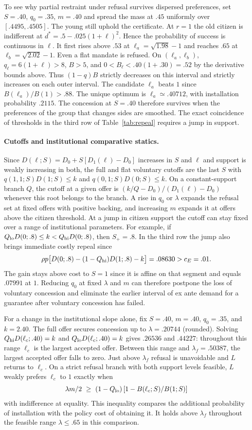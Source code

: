 \documentclass[11pt,letterpaper]{article}
\begin{document}
To see why partial restraint under refusal survives dispersed preferences, set $S=.40$, $q_0=.35$, $m=.40$ and spread the mass at $.45$ uniformly over $[.4495,.4505]$. The young still uphold the certificate. At $r=1$ the old citizen is indifferent at $d^*=.5-.025(1+\ell)^2$. Hence the probability of success is continuous in $\ell$. It first rises above $.53$ at $\ell_a=\sqrt{1.98}-1$ and reaches $.65$ at $\ell_b=\sqrt{2.02}-1$. Even a flat mandate is refused. On $(\ell_a,\ell_b)$, $q_\ell=6(1+\ell)>8$, $B>5$, and $0<B_\ell<.40(1+.30)=.52$ by the derivative bounds above. Thus $(1-q)B$ strictly decreases on this interval and strictly increases on each outer interval. The candidate $\ell_a$ beats $1$ since $B(\ell_a)/B(1)>.88$. The unique optimum is $\ell_a\simeq .40712$, with installation probability $.2115$. The concession at $S=.40$ therefore survives when the preferences of the group that changes sides are smoothed. The exact coincidence of thresholds in the third row of Table~\ref{tab:repeal} requires a jump in support.

\paragraph{Cutoffs and institutional comparative statics.}
Since $D(\ell;S)=D_0+S[D_1(\ell)-D_0]$ increases in $S$ and $\ell$ and support is weakly increasing in both, the full and flat voluntary cutoffs are the last $S$ with $q(1,1;S)D(1;S)\le k$ and $q(0,1;S)D(0;S)\le k$. On a constant-support branch $Q$, the cutoff at a given offer is $(k/Q-D_0)/(D_1(\ell)-D_0)$ whenever this root belongs to the branch. A rise in $q_0$ or $\lambda$ expands the refusal set at fixed offers with positive backing, and increasing $m$ expands it at offers above the citizen threshold. At a jump in citizen support the cutoff can stay fixed over a range of institutional parameters. For example, if $Q_{\rm lo}D(0;.8)\le k<Q_{\rm hi}D(0;.8)$, then $S_+=.8$. In the third row the jump also brings immediate costly repeal since
\[
 \rho p\big[D(0;.8)-(1-Q_{\rm hi})D(1;.8)-k\big]
 =.08630>c_E=.01 .
\]
The gain stays above cost to $S=1$ since it is affine on that segment and equals $.07991$ at $1$. Reducing $q_0$ at fixed $\lambda$ and $m$ can therefore postpone the loss of voluntary concession and eliminate the earlier interval of ex ante demand for a guarantee after voluntary concession has failed.

For a change in the institutional slope alone, fix $S=.40$, $m=.40$, $q_0=.35$, and $k=2.40$. The full offer secures concession up to $\lambda=.20744$ (rounded). Solving $Q_{\rm hi}D(\ell_c;.40)=k$ and $Q_{\rm lo}D(\ell_c;.40)=k$ gives $.26536$ and $.44227$: throughout this range $\ell_c$ is the largest accepted offer. Between this range and $\lambda_f=.50387$, the largest accepted offer falls to zero. Just above $\lambda_f$ refusal is unavoidable and $L$ returns to $\ell_c$. On a strict refusal branch with both support levels feasible, $L$ weakly prefers $\ell_c$ to $1$ exactly when
\[
 \lambda m/2\ \ge\ (1-Q_{\rm lo})\,[1-B(\ell_c;S)/B(1;S)]
\]
with indifference at equality. This inequality compares the additional probability of installation with the policy cost of obtaining it. It holds above $\lambda_f$ throughout the feasible range $\lambda\le .65$ in this comparison.
\end{document}
